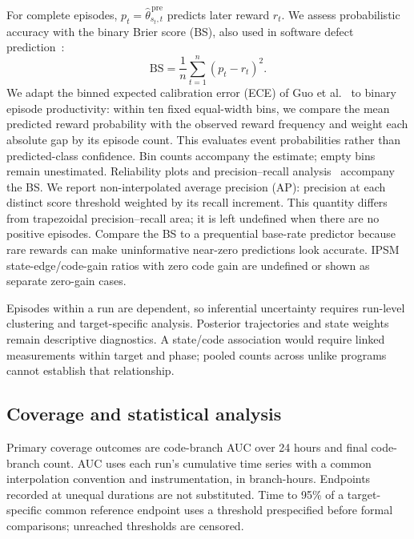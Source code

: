 \documentclass[final,5p,times,number]{elsarticle}
\begin{document}
For complete episodes, $p_t=\widehat{\theta}_{s_t,t}^{\,\mathrm{pre}}$ predicts later reward $r_t$. We assess probabilistic accuracy with the binary Brier score (BS), also used in software defect prediction~\cite{validation2017}:
\begin{equation}
\mathrm{BS}=\frac{1}{n}\sum_{t=1}^{n}(p_t-r_t)^2.
\end{equation}
We adapt the binned expected calibration error (ECE) of Guo et al.~\cite{guo2017calibration} to binary episode productivity: within ten fixed equal-width bins, we compare the mean predicted reward probability with the observed reward frequency and weight each absolute gap by its episode count. This evaluates event probabilities rather than predicted-class confidence. Bin counts accompany the estimate; empty bins remain unestimated. Reliability plots and precision--recall analysis~\cite{davis2006pr} accompany the BS. We report non-interpolated average precision (AP): precision at each distinct score threshold weighted by its recall increment. This quantity differs from trapezoidal precision--recall area; it is left undefined when there are no positive episodes. Compare the BS to a prequential base-rate predictor because rare rewards can make uninformative near-zero predictions look accurate. IPSM state-edge/code-gain ratios with zero code gain are undefined or shown as separate zero-gain cases.

Episodes within a run are dependent, so inferential uncertainty requires run-level clustering and target-specific analysis. Posterior trajectories and state weights remain descriptive diagnostics. A state/code association would require linked measurements within target and phase; pooled counts across unlike programs cannot establish that relationship.

\subsection{Coverage and statistical analysis}
Primary coverage outcomes are code-branch AUC over 24 hours and final code-branch count. AUC uses each run's cumulative time series with a common interpolation convention and instrumentation, in branch-hours. Endpoints recorded at unequal durations are not substituted. Time to 95\% of a target-specific common reference endpoint uses a threshold prespecified before formal comparisons; unreached thresholds are censored.
\end{document}
